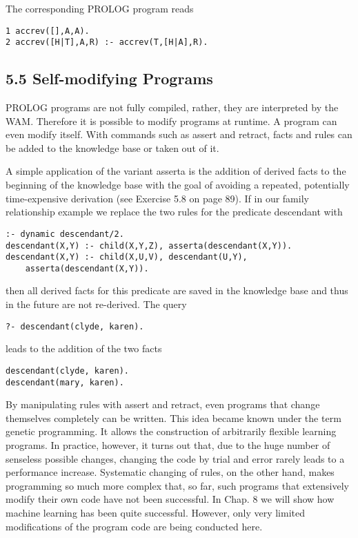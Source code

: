 \documentclass[10pt]{article}
\begin{document}
The corresponding PROLOG program reads

\begin{verbatim}
1 accrev([],A,A).
2 accrev([H|T],A,R) :- accrev(T,[H|A],R).
\end{verbatim}

\subsection*{5.5 Self-modifying Programs}
PROLOG programs are not fully compiled, rather, they are interpreted by the WAM. Therefore it is possible to modify programs at runtime. A program can even modify itself. With commands such as assert and retract, facts and rules can be added to the knowledge base or taken out of it.

A simple application of the variant asserta is the addition of derived facts to the beginning of the knowledge base with the goal of avoiding a repeated, potentially time-expensive derivation (see Exercise 5.8 on page 89). If in our family relationship example we replace the two rules for the predicate descendant with

\begin{verbatim}
:- dynamic descendant/2.
descendant(X,Y) :- child(X,Y,Z), asserta(descendant(X,Y)).
descendant(X,Y) :- child(X,U,V), descendant(U,Y),
    asserta(descendant(X,Y)).
\end{verbatim}

then all derived facts for this predicate are saved in the knowledge base and thus in the future are not re-derived. The query

\begin{verbatim}
?- descendant(clyde, karen).
\end{verbatim}

leads to the addition of the two facts

\begin{verbatim}
descendant(clyde, karen).
descendant(mary, karen).
\end{verbatim}

By manipulating rules with assert and retract, even programs that change themselves completely can be written. This idea became known under the term genetic programming. It allows the construction of arbitrarily flexible learning programs. In practice, however, it turns out that, due to the huge number of senseless possible changes, changing the code by trial and error rarely leads to a performance increase. Systematic changing of rules, on the other hand, makes programming so much more complex that, so far, such programs that extensively modify their own code have not been successful. In Chap. 8 we will show how machine learning has been quite successful. However, only very limited modifications of the program code are being conducted here.
\end{document}
